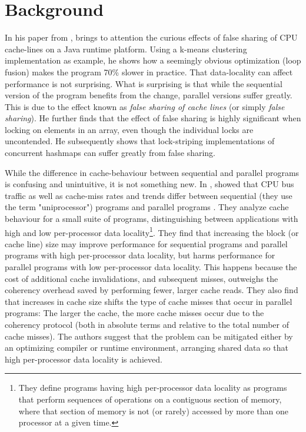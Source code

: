 \chapter{Background}
In his paper \cite{mystery} from \citeyear{mystery}, \citeauthor{mystery} brings
to attention the curious effects of false sharing of CPU cache-lines on a Java
runtime platform. Using a k-means clustering implementation as example, he shows
how a seemingly obvious optimization (loop fusion) makes the program 70\% slower
in practice. That data-locality can affect performance is not surprising.
What is surprising is that while the sequential version of the program benefits
from the change, parallel versions suffer greatly. This is due to the effect
known as \textit{false sharing of cache lines} (or simply \textit{false
sharing}). He further finds that the effect of false sharing is highly
significant when locking on elements in an array, even though the individual
locks are uncontended. He subsequently shows that lock-striping implementations
of concurrent hashmaps can suffer greatly from false sharing.

While the difference in cache-behaviour between sequential and parallel programs
is confusing and unintuitive, it is not something new. In \citeyear{eggersbus},
\citeauthor{eggersbus} showed that CPU bus traffic as well as cache-miss
rates and trends differ between sequential (they use the term "uniprocessor")
programs and parallel programs \cite{eggersbus}.
They analyze cache behaviour for a small suite of programs, distinguishing
between applications with high and low per-processor data locality\footnote{They
define programs having high per-processor data locality as programs that perform
sequences of operations on a contiguous section of memory, where that section of
memory is not (or rarely) accessed by more than one processor at a given time.}.
They find that increasing the block (or cache line) size may improve
performance for sequential programs and parallel programs with high
per-processor data locality, but harms performance for parallel programs with
low per-processor data locality. This happens because the cost of additional cache
invalidations, and subsequent misses, outweighs the coherency overhead saved by
performing fewer, larger cache reads. They also find that increases in cache
size shifts the type of cache misses that occur in parallel programs: The larger
the cache, the more cache misses occur due to the coherency protocol (both in
absolute terms and relative to the total number of cache misses). The authors
suggest that the problem can be mitigated either by an optimizing compiler or
runtime environment, arranging shared data so that high per-processor data
locality is achieved.

